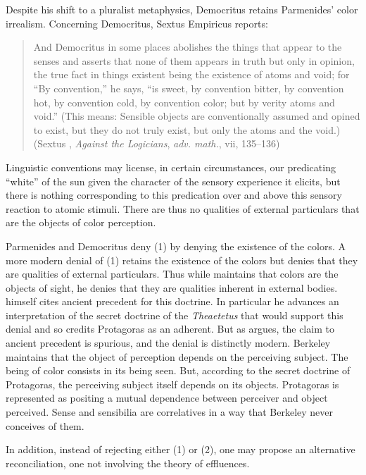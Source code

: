 Despite his shift to a pluralist metaphysics, Democritus retains Parmenides' color irrealism. Concerning Democritus, Sextus Empiricus reports:
\begin{quote}
	And Democritus in some places abolishes the things that appear to the senses and asserts that none of them appears in truth but only in opinion, the true fact in things existent being the existence of atoms and void; for ``By convention,'' he says, ``is sweet, by convention bitter, by convention hot, by convention cold, by convention color; but by verity atoms and void.'' (This means: Sensible objects are conventionally assumed and opined to exist, but they do not truly exist, but only the atoms and the void.) (Sextus \citeauthor{Empiricus:1997kx}, \emph{Against the Logicians}, \emph{adv. math.}, vii, 135--136) 
\end{quote}
Linguistic conventions may license, in certain circumstances, our predicating ``white'' of the sun given the character of the sensory experience it elicits, but there is nothing corresponding to this predication over and above this sensory reaction to atomic stimuli. There are thus no qualities of external particulars that are the objects of color perception. 

Parmenides and Democritus deny (1) by denying the existence of the colors. A more modern denial of (1) retains the existence of the colors but denies that they are qualities of external particulars. Thus while \citet{Berkeley:1734fk} maintains that colors are the objects of sight, he denies that they are qualities inherent in external bodies. \citet{Berkeley:1744rm} himself cites ancient precedent for this doctrine. In particular he advances an interpretation of the secret doctrine of the \emph{Theaetetus} that would support this denial and so credits Protagoras as an adherent. But as \citet{Burnyeat:1982mz} argues, the claim to ancient precedent is spurious, and the denial is distinctly modern. Berkeley maintains that the object of perception depends on the perceiving subject. The being of color consists in its being seen. But, according to the secret doctrine of Protagoras, the perceiving subject itself depends on its objects. Protagoras is represented as positing a mutual dependence between perceiver and object perceived. Sense and sensibilia are correlatives in a way that Berkeley never conceives of them.

In addition, instead of rejecting either (1) or (2), one may propose an alternative reconciliation, one not involving the theory of effluences. 

